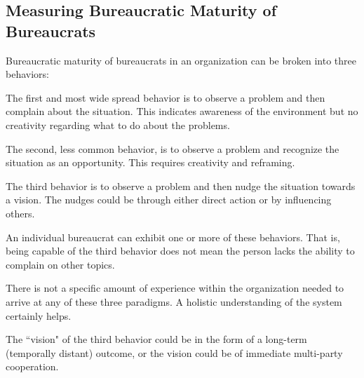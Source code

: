 \subsection{Measuring Bureaucratic Maturity of Bureaucrats}

Bureaucratic maturity of bureaucrats in an organization can be broken into three behaviors: 

The first and most wide spread behavior is to observe a problem and then complain about the situation. This indicates awareness of the environment but no creativity regarding what to do about the problems.

The second, less common behavior, is to observe a problem and recognize the situation as an opportunity. This requires creativity and reframing. 

The third behavior is to observe a problem and then nudge the situation towards a vision. The nudges could be through either direct action or by influencing others. 



An individual bureaucrat can exhibit one or more of these behaviors. That is, being capable of the third behavior does not mean the person lacks the ability to complain on other topics. 

There is not a specific amount of experience within the organization needed to arrive at any of these three paradigms. A holistic understanding of the system certainly helps.

The ``vision" of the third behavior could be in the form of a long-term (temporally distant) outcome, or the vision could be of immediate multi-party cooperation. 